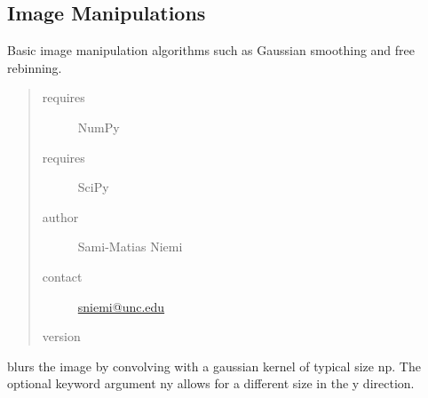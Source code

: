 \documentclass[a4paper,11pt,english]{sphinxmanual}
\begin{document}
\label{support:module-support.imageManipulation}

\subsection{Image Manipulations}
\label{support:image-manipulations}
Basic image manipulation algorithms such as Gaussian smoothing and free rebinning.
\begin{quote}\begin{description}
\item[{requires}] \leavevmode
NumPy

\item[{requires}] \leavevmode
SciPy

\item[{author}] \leavevmode
Sami-Matias Niemi

\item[{contact}] \leavevmode
\href{mailto:sniemi@unc.edu}{sniemi@unc.edu}

\item[{version}] 

\end{description}\end{quote}

\begin{fulllineitems}
\label{support:support.imageManipulation.blurImage}
blurs the image by convolving with a gaussian kernel of typical
size np. The optional keyword argument ny allows for a different
size in the y direction.

\end{fulllineitems}

\end{document}
